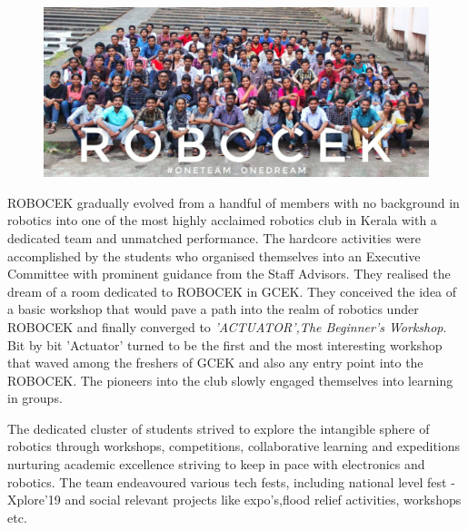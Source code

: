 \begin{figure}
    \centering
    \includegraphics{Images/ROBOCEK/robocek.jpeg}
\end{figure}

\par ROBOCEK gradually evolved from a handful of members with no background in robotics into one of the most highly acclaimed robotics club in Kerala with a dedicated team and unmatched performance. The hardcore activities were accomplished by the students who organised themselves into an Executive Committee with prominent guidance from the Staff Advisors. They realised the dream of a room dedicated to ROBOCEK in GCEK. They conceived the idea of a basic workshop that would pave a path into the realm of robotics under ROBOCEK and finally converged to \textit{'ACTUATOR',The Beginner's Workshop}. Bit by bit 'Actuator' turned to be the first and the most interesting workshop that waved among the freshers of GCEK and also any entry point into the ROBOCEK. The pioneers into the club slowly engaged themselves into learning in groups.

The dedicated cluster of students strived to explore the intangible sphere of robotics through workshops, competitions, collaborative learning and expeditions nurturing academic excellence striving to keep in pace with electronics and robotics. The team endeavoured various tech fests, including national level fest - Xplore'19 and social relevant projects like expo's,flood relief activities, workshops etc.

